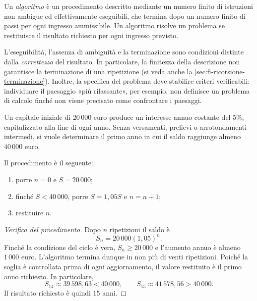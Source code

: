 \begin{definition}[Algoritmo]
\label{def:fi-algoritmo}
Un \emph{algoritmo} è un procedimento descritto mediante un numero finito
di istruzioni non ambigue ed effettivamente eseguibili, che termina dopo
un numero finito di passi per ogni ingresso ammissibile. Un algoritmo
risolve un problema se restituisce il risultato richiesto per ogni
ingresso previsto.
\end{definition}

L'eseguibilità, l'assenza di ambiguità e la terminazione sono condizioni
distinte dalla \emph{correttezza} del risultato. In particolare, la
finitezza della descrizione non garantisce la terminazione di una
ripetizione (si veda anche la \cref{sec:fi-ricorsione-terminazione}).
Inoltre, la specifica del problema deve stabilire criteri
verificabili: individuare il paesaggio «più rilassante», per esempio,
non definisce un problema di calcolo finché non viene precisato
come confrontare i paesaggi.

\clearpage

\begin{example}
\label{ex:fi-interesse-composto}
Un capitale iniziale di \(20\,000\) euro produce un interesse annuo
costante del \(5\%\), capitalizzato alla fine di ogni anno. Senza
versamenti, prelievi o arrotondamenti intermedi, si vuole determinare
il primo anno in cui il saldo raggiunge almeno \(40\,000\) euro.

Il procedimento è il seguente:
\begin{enumerate}
  \item porre \(n=0\) e \(S=20\,000\);
  \item finché \(S<40\,000\), porre \(S=1{,}05S\) e \(n=n+1\);
  \item restituire \(n\).
\end{enumerate}
\end{example}

\begin{proof}[Verifica del procedimento]
Dopo \(n\) ripetizioni il saldo è
\[
  S_n=20\,000(1{,}05)^n.
\]
Finché la condizione del ciclo è vera, \(S_n\ge20\,000\) e l'aumento
annuo è almeno \(1\,000\) euro. L'algoritmo termina dunque in non più
di venti ripetizioni. Poiché la soglia è controllata prima di ogni
aggiornamento, il valore restituito è il primo anno richiesto.
In particolare,
\[
  S_{14}\approx39\,598{,}63<40\,000,
  \qquad
  S_{15}\approx41\,578{,}56>40\,000.
\]
Il risultato richiesto è quindi \(15\) anni.
\end{proof}

